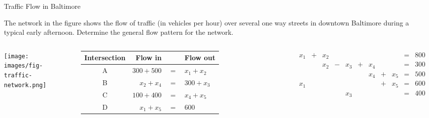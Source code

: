 \documentclass[xcolor=dvipsnames,aspectratio=169,t]{beamer}
\begin{document}
\begin{frame}{Traffic Flow in Baltimore}

  The network in the figure shows the flow of traffic (in vehicles per hour) over several one way streets in downtown Baltimore during a typical early afternoon. Determine the general flow pattern for the network.

  \begin{columns}
    \column{0.4\tw}
    
  \texttt{[image: images/fig-traffic-network.png]}

  \column{0.6\tw}
  
  \begin{tabular}{crcl}
    \hline
    Intersection & Flow in & & Flow out\\
    \hline
    A & $300+500$ & $=$ & $x_1+x_2$\\
    B & $x_2 + x_4$ & $=$ & $300+x_3$\\
    C & $100+400$ & $=$ & $x_4+x_5$\\
    D & $x_1+x_5$ & $=$ & $600$\\
    \hline
  \end{tabular}

  \[
  \begin{array}{ccccccccccc}
    x_1 & + & x_2 &   &         &    &        &   &          &= & 800\\
           &     & x_2 & - & x_3 & + & x_4 &   &         &=& 300\\
           &     &        &    &        &    & x_4 & + & x_5 &=& 500\\
    x_1 &     &        &    &       &     &        & + & x_5 &=& 600\\
           &      &        &   & x_3 &    &        &     &        &=& 400
  \end{array}
  \]

  \end{columns}
   
  \end{frame}
\end{document}
